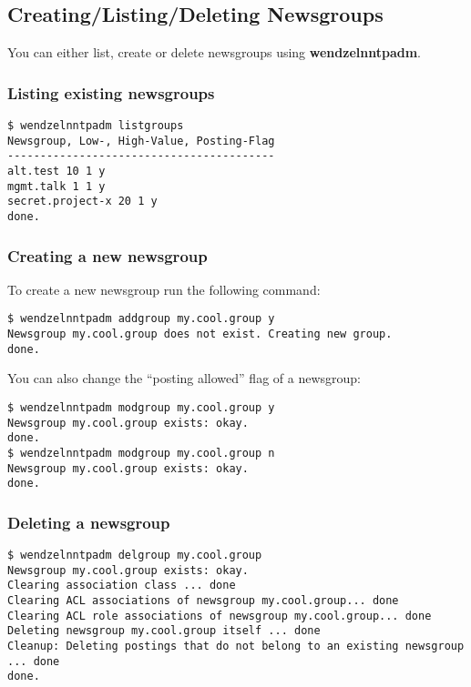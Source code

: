 \documentclass[12pt,fleqn,leqno]{scrbook}
\begin{document}
\hypertarget{creatinglistingdeleting-newsgroups-1}{%
\subsection{Creating/Listing/Deleting
Newsgroups}\label{creatinglistingdeleting-newsgroups-1}}

You can either list, create or delete newsgroups using
\textbf{wendzelnntpadm}.

\hypertarget{listing-existing-newsgroups-1}{%
\subsubsection{Listing existing
newsgroups}\label{listing-existing-newsgroups-1}}

\begin{verbatim}
$ wendzelnntpadm listgroups
Newsgroup, Low-, High-Value, Posting-Flag
-----------------------------------------
alt.test 10 1 y
mgmt.talk 1 1 y
secret.project-x 20 1 y
done.
\end{verbatim}

\hypertarget{creating-a-new-newsgroup-1}{%
\subsubsection{Creating a new
newsgroup}\label{creating-a-new-newsgroup-1}}

To create a new newsgroup run the following command:

\begin{verbatim}
$ wendzelnntpadm addgroup my.cool.group y
Newsgroup my.cool.group does not exist. Creating new group.
done.
\end{verbatim}

You can also change the ``posting allowed'' flag of a newsgroup:

\begin{verbatim}
$ wendzelnntpadm modgroup my.cool.group y
Newsgroup my.cool.group exists: okay.
done.
$ wendzelnntpadm modgroup my.cool.group n
Newsgroup my.cool.group exists: okay.
done.
\end{verbatim}

\hypertarget{deleting-a-newsgroup-1}{%
\subsubsection{Deleting a newsgroup}\label{deleting-a-newsgroup-1}}

\begin{verbatim}
$ wendzelnntpadm delgroup my.cool.group
Newsgroup my.cool.group exists: okay.
Clearing association class ... done
Clearing ACL associations of newsgroup my.cool.group... done
Clearing ACL role associations of newsgroup my.cool.group... done
Deleting newsgroup my.cool.group itself ... done
Cleanup: Deleting postings that do not belong to an existing newsgroup ... done
done.
\end{verbatim}
\end{document}
